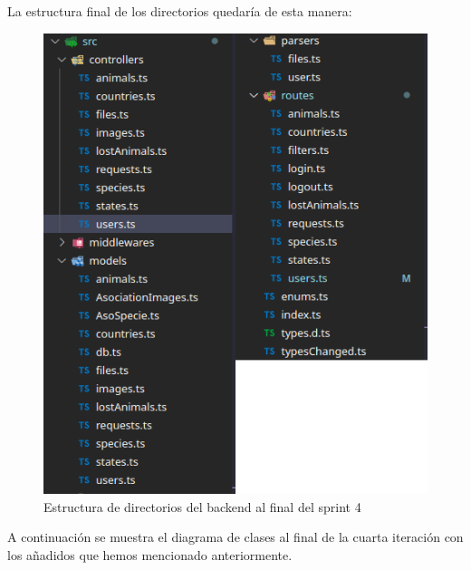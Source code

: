 La estructura final de los directorios quedaría de esta manera:
\begin{figure}[H]
	\centering
	\includegraphics[width=0.7\linewidth]{"sprint 4/directorios"}
	\caption{Estructura de directorios del backend al final del sprint 4}
	\label{fig:directorios4}
\end{figure}

A continuación se muestra el diagrama de clases al final de la cuarta iteración con los añadidos que hemos mencionado anteriormente.

\pagebreak

